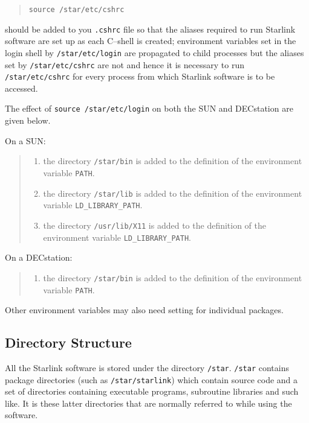 \begin{quote}

{\tt source /star/etc/cshrc}

\end{quote}

should be added to you {\tt .cshrc} file so that the aliases required to 
run Starlink software are set up as each C--shell is created; environment
variables set in the login shell by {\tt /star/etc/login} are propagated
to child processes but the aliases set by {\tt /star/etc/cshrc} are not
and hence it is necessary to run {\tt /star/etc/cshrc} for every 
process from which Starlink software is to be accessed.

The effect of {\tt source /star/etc/login} 
on both the SUN and DECstation are given below.

On a SUN:
\begin{quote}
\begin{enumerate}
\item the directory {\tt /star/bin} is added to the definition of the
environment variable {\tt PATH}.
\item the directory {\tt /star/lib} is added to the definition of the
environment variable {\tt LD\_LIBRARY\_PATH}.
\item the directory {\tt /usr/lib/X11} is added to the definition of the
environment variable {\tt LD\_LIBRARY\_PATH}.
\end{enumerate}
\end{quote}

\goodbreak
On a DECstation:
\begin{quote}
\begin{enumerate}
\item the directory {\tt /star/bin} is added to the definition of the
environment variable {\tt PATH}.
\end{enumerate}
\end{quote}

Other environment variables may also need setting for individual packages.

\subsection{Directory Structure}
All the Starlink software is stored under the directory {\tt /star}.
{\tt /star} contains package directories (such as {\tt /star/starlink})
which contain source code and a set of directories containing executable
programs, subroutine libraries and such like. It is these latter
directories that are normally referred to while using the software.

